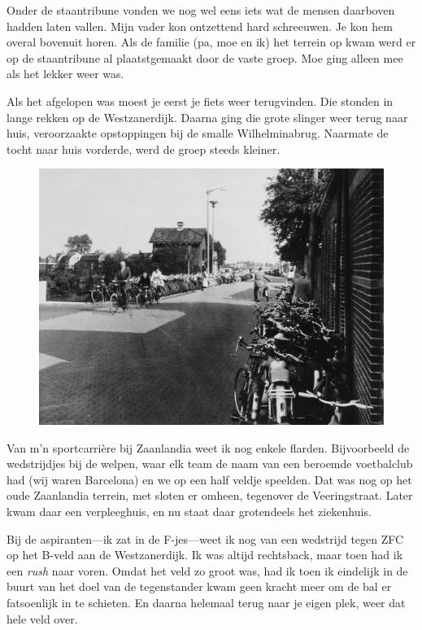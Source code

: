 \documentclass[10pt,twoside, openright]{memoir}
\begin{document}
Onder de staantribune vonden we nog wel eens iets wat de mensen daarboven hadden laten vallen. Mijn vader kon ontzettend hard schreeuwen. Je kon hem overal bovenuit horen. Als de familie (pa, moe en ik) het terrein op kwam werd er op de staantribune al plaatstgemaakt door de vaste groep. Moe ging alleen mee als het lekker weer was. 

Als het afgelopen was moest je eerst je fiets weer terugvinden. Die stonden in lange rekken op de Westzanerdijk. Daarna ging die grote slinger weer terug naar huis, veroorzaakte opstoppingen bij de smalle Wilhelminabrug. Naarmate de tocht naar huis vorderde, werd de groep steeds kleiner. 

\begin{figure}
\includegraphics[width=\textwidth]{img/75zfc2}
\end{figure}

Van m’n sportcarrière bij Zaanlandia weet ik nog enkele flarden. Bijvoorbeeld de wedstrijdjes bij de welpen, waar elk team de naam van een beroemde voetbalclub had (wij waren Barcelona) en we op een half veldje speelden. Dat was nog op het oude Zaanlandia terrein, met sloten er omheen, tegenover de Veeringstraat. Later kwam daar een verpleeghuis, en nu staat daar grotendeels het ziekenhuis.

Bij de aspiranten---ik zat in de F-jes---weet ik nog van een wedstrijd tegen ZFC op het B-veld aan de Westzanerdijk. Ik was altijd rechtsback, maar toen had ik een \emph{rush} naar voren. Omdat het veld zo groot was, had ik toen ik eindelijk in de buurt van het doel van de tegenstander kwam geen kracht meer om de bal er fatsoenlijk in te schieten. En daarna helemaal terug naar je eigen plek, weer dat hele veld over. 
\end{document}
